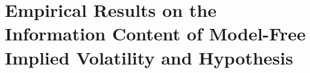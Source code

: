 
\section{Empirical Results on the Information Content of Model-Free Implied Volatility and Hypothesis}\label{sec:3Literature}










